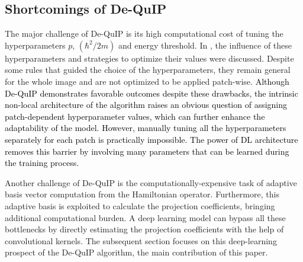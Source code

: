 \documentclass[10pt,journal,compsoc]{IEEEtran}
\newcommand{\sd}{\textcolor{black}}
\begin{document}
\subsection{Shortcomings of De-QuIP}
\label{sec:short_dequip}
The major challenge of De-QuIP is its high computational cost of tuning the hyperparameters $p$, $(\hbar ^2/2m)$ and energy threshold. In \cite{dutta2022novel}, the influence of these hyperparameters and strategies to optimize their values were discussed. Despite some rules that guided the choice of the hyperparameters, they remain general for the whole image and are not optimized to be applied patch-wise.
\sd{Although De-QuIP demonstrates favorable outcomes despite these drawbacks, the intrinsic non-local architecture of the algorithm raises an obvious question of assigning patch-dependent hyperparameter values, which can further enhance the adaptability of the model. However, manually tuning all the hyperparameters separately for each patch is practically impossible. The power of DL architecture removes this barrier by involving many parameters that can be learned during the training process.}


Another challenge of De-QuIP is the computationally-expensive task of adaptive basis vector computation from the Hamiltonian operator. Furthermore, this adaptive basis is exploited to calculate the projection coefficients, bringing additional computational burden. A deep learning model can bypass all these bottlenecks by directly estimating the projection coefficients with the help of convolutional kernels. The subsequent section focuses on this deep-learning prospect of the De-QuIP algorithm, the main contribution of this paper.





\end{document}
